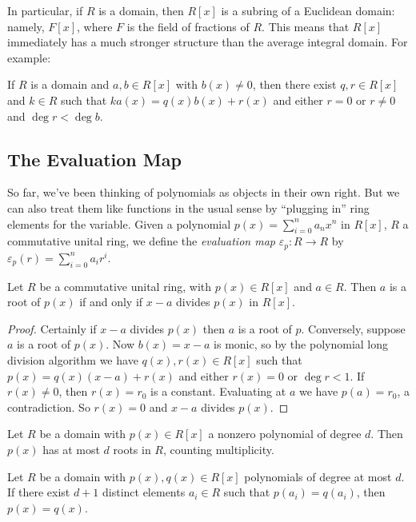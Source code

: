 \documentclass{article}
\begin{document}
In particular, if $R$ is a domain, then $R[x]$ is a subring of a Euclidean domain: namely, $F[x]$, where $F$ is the field of fractions of $R$. This means that $R[x]$ immediately has a much stronger structure than the average integral domain. For example:

\begin{prop}
If $R$ is a domain and $a,b \in R[x]$ with $b(x) \neq 0$, then there exist $q,r \in R[x]$ and $k \in R$ such that $ka(x) = q(x)b(x) + r(x)$ and either $r = 0$ or $r \neq 0$ and $\deg{r} < \deg{b}$.
\end{prop}

\subsection*{The Evaluation Map}

So far, we've been thinking of polynomials as objects in their own right. But we can also treat them like functions in the usual sense by ``plugging in'' ring elements for the variable. Given a polynomial $p(x) = \sum_{i=0}^n a_nx^n$ in $R[x]$, $R$ a commutative unital ring, we define the \emph{evaluation map} $\varepsilon_p : R \rightarrow R$ by $\varepsilon_p(r) = \sum_{i=0}^n a_i r^i$.

\begin{prop}
Let $R$ be a commutative unital ring, with $p(x) \in R[x]$ and $a \in R$. Then $a$ is a root of $p(x)$ if and only if $x-a$ divides $p(x)$ in $R[x]$.
\end{prop}

\begin{proof}
Certainly if $x-a$ divides $p(x)$ then $a$ is a root of $p$. Conversely, suppose $a$ is a root of $p(x)$. Now $b(x) = x - a$ is monic, so by the polynomial long division algorithm we have $q(x), r(x) \in R[x]$ such that $p(x) = q(x)(x-a) + r(x)$ and either $r(x) = 0$ or $\deg{r} < 1$. If $r(x) \neq 0$, then $r(x) = r_0$ is a constant. Evaluating at $a$ we have $p(a) = r_0$, a contradiction. So $r(x) = 0$ and $x-a$ divides $p(x)$.
\end{proof}

\begin{cor}
Let $R$ be a domain with $p(x) \in R[x]$ a nonzero polynomial of degree $d$. Then $p(x)$ has at most $d$ roots in $R$, counting multiplicity.
\end{cor}

\begin{cor}
Let $R$ be a domain with $p(x), q(x) \in R[x]$ polynomials of degree at most $d$. If there exist $d+1$ distinct elements $a_i \in R$ such that $p(a_i) = q(a_i)$, then $p(x) = q(x)$.
\end{cor}
\end{document}
